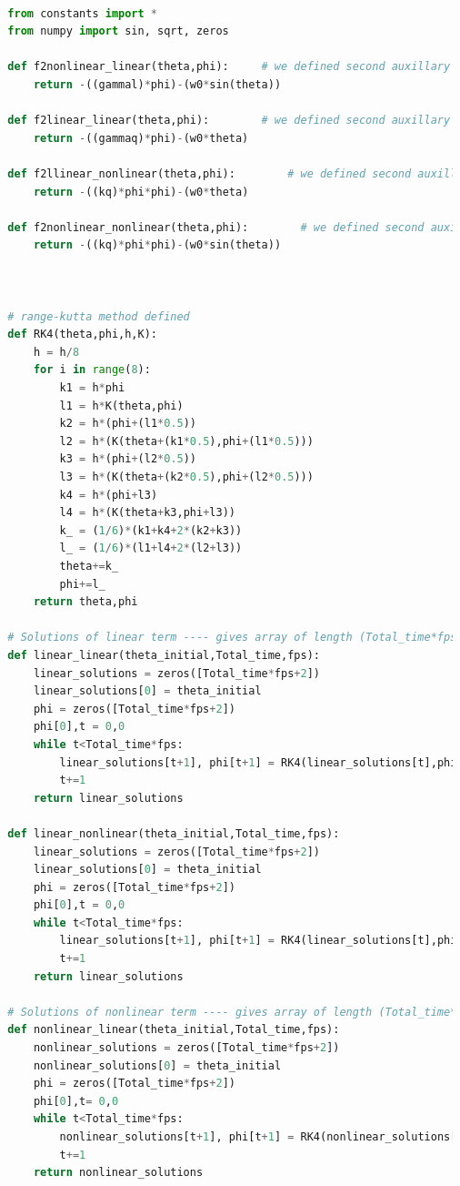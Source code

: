 \documentclass[11pt,a4paper]{article}
\begin{document}
\begin{lstlisting}[language=Python]

  from constants import *
  from numpy import sin, sqrt, zeros

  def f2nonlinear_linear(theta,phi):     # we defined second auxillary equation from nonlinear term.
      return -((gammal)*phi)-(w0*sin(theta))

  def f2linear_linear(theta,phi):        # we defined second auxillary equation from linear term.
      return -((gammaq)*phi)-(w0*theta)

  def f2llinear_nonlinear(theta,phi):        # we defined second auxillary equation from linear term.
      return -((kq)*phi*phi)-(w0*theta)

  def f2nonlinear_nonlinear(theta,phi):        # we defined second auxillary equation from linear term.
      return -((kq)*phi*phi)-(w0*sin(theta))



  # range-kutta method defined
  def RK4(theta,phi,h,K): 
      h = h/8
      for i in range(8):
          k1 = h*phi
          l1 = h*K(theta,phi)
          k2 = h*(phi+(l1*0.5))
          l2 = h*(K(theta+(k1*0.5),phi+(l1*0.5)))
          k3 = h*(phi+(l2*0.5))
          l3 = h*(K(theta+(k2*0.5),phi+(l2*0.5)))
          k4 = h*(phi+l3)
          l4 = h*(K(theta+k3,phi+l3))
          k_ = (1/6)*(k1+k4+2*(k2+k3))
          l_ = (1/6)*(l1+l4+2*(l2+l3))
          theta+=k_
          phi+=l_
      return theta,phi

  # Solutions of linear term ---- gives array of length (Total_time*fps)
  def linear_linear(theta_initial,Total_time,fps):
      linear_solutions = zeros([Total_time*fps+2])
      linear_solutions[0] = theta_initial
      phi = zeros([Total_time*fps+2])
      phi[0],t = 0,0
      while t<Total_time*fps:
          linear_solutions[t+1], phi[t+1] = RK4(linear_solutions[t],phi[t],1/fps,f2linear_linear)
          t+=1
      return linear_solutions

  def linear_nonlinear(theta_initial,Total_time,fps):
      linear_solutions = zeros([Total_time*fps+2])
      linear_solutions[0] = theta_initial
      phi = zeros([Total_time*fps+2])
      phi[0],t = 0,0
      while t<Total_time*fps:
          linear_solutions[t+1], phi[t+1] = RK4(linear_solutions[t],phi[t],1/fps,f2llinear_nonlinear)
          t+=1
      return linear_solutions

  # Solutions of nonlinear term ---- gives array of length (Total_time*fps)
  def nonlinear_linear(theta_initial,Total_time,fps):
      nonlinear_solutions = zeros([Total_time*fps+2])
      nonlinear_solutions[0] = theta_initial
      phi = zeros([Total_time*fps+2])
      phi[0],t= 0,0
      while t<Total_time*fps:
          nonlinear_solutions[t+1], phi[t+1] = RK4(nonlinear_solutions[t],phi[t],1/fps,f2nonlinear_linear)
          t+=1
      return nonlinear_solutions


\end{lstlisting}
\end{document}
